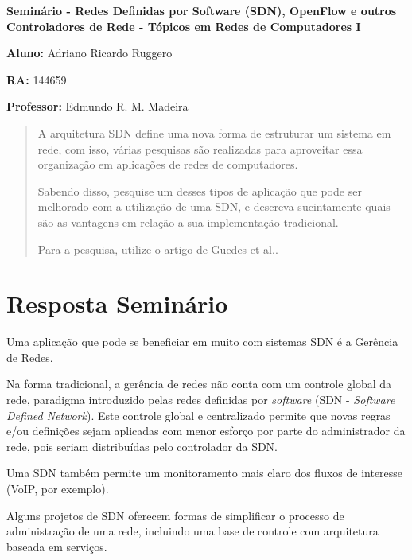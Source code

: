 \documentclass[12pt,twoside,a4paper]{article}
\begin{document}
\vskip 15mm

\begin{center} 
\textbf{Seminário  - Redes Definidas por Software (SDN),
OpenFlow e outros Controladores de Rede - Tópicos em Redes de Computadores I}

\end{center}

\vskip 5mm

\textbf{Aluno:} Adriano Ricardo Ruggero

\textbf{RA:} 144659

\textbf{Professor:} Edmundo R. M. Madeira

\vskip 20mm

\begin{abstract}

A arquitetura SDN define uma nova forma de estruturar um
sistema em rede, com isso, várias pesquisas são realizadas
para aproveitar essa organização em aplicações de redes de
computadores.

Sabendo disso, pesquise um desses tipos de aplicação que
pode ser melhorado com a utilização de uma SDN, e descreva
sucintamente quais são as vantagens em relação a sua
implementação tradicional.

Para a pesquisa, utilize o artigo de Guedes et al.\cite{SDN}.


\end{abstract}

\newpage
\pagestyle{plain}
\headheight 0.0cm
\headsep 0.0cm
\footskip 2.2cm

\section{Resposta Seminário}
\label{sec:01}

Uma aplicação que pode se beneficiar em muito com sistemas SDN é a Gerência de Redes.

Na forma tradicional, a gerência de redes não conta com um controle global da rede, paradigma introduzido pelas redes definidas por \textit{software} (SDN - \textit{Software Defined Network}). Este controle global e centralizado permite que novas regras e/ou definições sejam aplicadas com menor esforço por parte do administrador da rede, pois seriam distribuídas pelo controlador da SDN. 

Uma SDN também permite um monitoramento mais claro dos fluxos de interesse (VoIP, por exemplo). 

Alguns projetos de SDN oferecem formas de simplificar o processo de administração de uma rede, incluindo uma base de controle com arquitetura baseada em serviços\cite{OMNI}.



\end{document}
